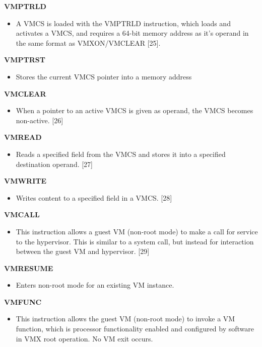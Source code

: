 \documentclass{report}
\begin{document}
\begin{spacing}{1.5}
{\textbf{VMPTRLD}
\begin{itemize}
\item[] A VMCS is loaded with the VMPTRLD instruction, which loads and activates a VMCS, and requires a 64-bit memory address as it's operand in the same format as VMXON/VMCLEAR [25].
\end{itemize}

\textbf{VMPTRST}
\begin{itemize}
\item[] {\large Stores the current VMCS pointer into a memory address}
\end{itemize}

\textbf{VMCLEAR}
\begin{itemize}
\item[] {\large When a pointer to an active VMCS is given as operand, the VMCS becomes non-active. [26]}
\end{itemize}


\textbf{VMREAD}
\begin{itemize}
\item[] {\large Reads a specified field from the VMCS and stores it into a specified destination operand. [27]}
\end{itemize}

\textbf{VMWRITE}
\begin{itemize}
\item[] {\large Writes content to a specified field in a VMCS. [28]}
\end{itemize}

\textbf{VMCALL}
\begin{itemize}
\item[] {\large This instruction allows a guest VM (non-root mode) to make a call for service to the hypervisor. This is similar to a system call, but instead for interaction between the guest VM and hypervisor. [29]}
\end{itemize}

\textbf{VMRESUME}
\begin{itemize}
\item[] Enters non-root mode for an existing VM instance.
\end{itemize}

\textbf{VMFUNC}
\begin{itemize}
\item[] {\large This instruction allows the guest VM (non-root mode) to invoke a VM function, which is processor functionality enabled and configured by software in VMX root operation. No VM exit occurs. }
\end{itemize}

}
\end{spacing}
\end{document}
